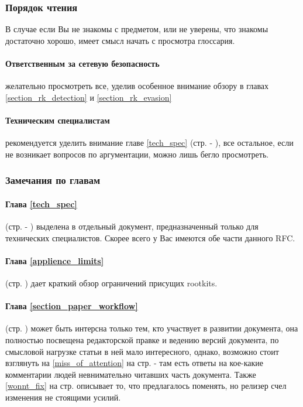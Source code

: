 \subsubsection{Порядок чтения}
\label{reading_notice}
В случае если Вы не знакомы с предметом, или не уверены, что знакомы
достаточно хорошо, имеет смысл начать с просмотра глоссария.\\

\paragraph{Ответственным за сетевую безопасность} желательно просмотреть все, уделив
особенное внимание обзору в главах \ref{section_rk_detection} и \ref{section_rk_evasion}\\

\paragraph{Техническим специалистам} рекомендуется уделить внимание главе \ref{tech_spec}
(стр. \pageref{tech_spec} - \pageref{tech_spec_end}), все остальное, если не возникает
вопросов по аргументации, можно лишь бегло просмотреть.

\subsubsection{Замечания по главам}

\paragraph{ Глава \ref{tech_spec} } (стр. \pageref{tech_spec} - \pageref{tech_spec_end})
выделена в отдельный документ, предназначенный только для технических специалистов.
Скорее всего у Вас имеются обе части данного RFC.

\paragraph{ Глава \ref{applience_limits}} (стр. \pageref{applience_limits}) дает
краткий обзор ограничений присущих rootkits.

\paragraph{ Глава \ref{section_paper_workflow}} (стр. \pageref{section_paper_workflow})
может быть интерсна только тем, кто участвует в развитии документа, она полностью посвещена редакторской правке и ведению версий документа, по смысловой нагрузке статьи в ней мало интересного,
однако, возможно стоит взглянуть на \ref{miss_of_attention} на стр. \pageref{miss_of_attention} - там есть ответы на кое-какие комментарии людей невнимательно читавших часть документа. Также \ref{wonnt_fix} на стр.
\pageref{wonnt_fix} описывает то, что предлагалось поменять, но релизер счел изменения не стоящими усилий.

